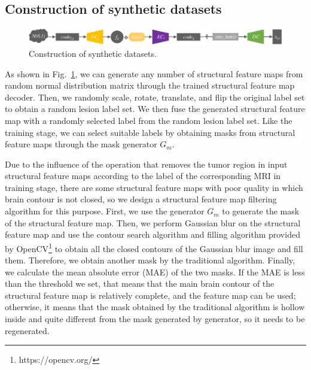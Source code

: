 \documentclass{ecai}
\begin{document}
\subsection{Construction of synthetic datasets}
\label{make dataset}
\begin{figure}
	\centering
	\includegraphics[width=1.78\columnwidth]{figures/make_data}
	\caption{Construction of synthetic datasets.}
	\label{make_data}
\end{figure}
As shown in Fig.~\ref{make_data}, we can generate any number of structural feature maps from random normal distribution matrix through the trained structural feature map decoder. Then, we randomly scale, rotate, translate, and flip the original label set to obtain a random lesion label set. We then fuse the generated structural feature map with a randomly selected label from the random lesion label set. Like the training stage, we can select suitable labels by obtaining masks from structural feature maps through the mask generator $G_m$.

Due to the influence of the operation that removes the tumor region in input structural feature maps according to the label of the corresponding MRI in training stage, there are some structural feature maps with poor quality in which brain contour is not closed, so we design a structural feature map filtering algorithm for this purpose. First, we use the generator $G_m$ to generate the mask of the structural feature map. Then, we perform Gaussian blur\cite{92wink2004denoising} on the structural feature map and use the contour search algorithm and filling algorithm provided by OpenCV\footnote{https://opencv.org/} to obtain all the closed contours of the Gaussian blur image and fill them. Therefore, we obtain another mask by the traditional algorithm. Finally, we calculate the mean absolute error (MAE) of the two masks. If the MAE is less than the threshold we set, that means that the main brain contour of the structural feature map is relatively complete, and the feature map can be used; otherwise, it means that the mask obtained by the traditional algorithm is hollow inside and quite different from the mask generated by generator, so it needs to be regenerated. 
\end{document}
